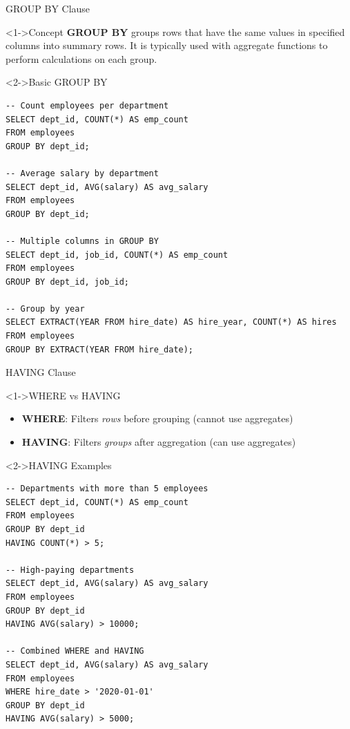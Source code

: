 \documentclass[aspectratio=169,11pt]{beamer}
\begin{document}
\begin{frame}[fragile]{GROUP BY Clause}
\begin{block}<1->{Concept}
\textbf{GROUP BY} groups rows that have the same values in specified columns into summary rows. It is typically used with aggregate functions to perform calculations on each group.
\end{block}

\pause
\begin{exampleblock}<2->{Basic GROUP BY}
\begin{lstlisting}
-- Count employees per department
SELECT dept_id, COUNT(*) AS emp_count
FROM employees
GROUP BY dept_id;

-- Average salary by department
SELECT dept_id, AVG(salary) AS avg_salary
FROM employees
GROUP BY dept_id;

-- Multiple columns in GROUP BY
SELECT dept_id, job_id, COUNT(*) AS emp_count
FROM employees
GROUP BY dept_id, job_id;

-- Group by year
SELECT EXTRACT(YEAR FROM hire_date) AS hire_year, COUNT(*) AS hires
FROM employees
GROUP BY EXTRACT(YEAR FROM hire_date);
\end{lstlisting}
\end{exampleblock}
\end{frame}

\begin{frame}[fragile]{HAVING Clause}
\begin{block}<1->{WHERE vs HAVING}
\begin{itemize}
    \item \textbf{WHERE}: Filters \textit{rows} before grouping (cannot use aggregates)
    \item \textbf{HAVING}: Filters \textit{groups} after aggregation (can use aggregates)
\end{itemize}
\end{block}

\pause
\begin{exampleblock}<2->{HAVING Examples}
\begin{lstlisting}
-- Departments with more than 5 employees
SELECT dept_id, COUNT(*) AS emp_count
FROM employees
GROUP BY dept_id
HAVING COUNT(*) > 5;

-- High-paying departments
SELECT dept_id, AVG(salary) AS avg_salary
FROM employees
GROUP BY dept_id
HAVING AVG(salary) > 10000;

-- Combined WHERE and HAVING
SELECT dept_id, AVG(salary) AS avg_salary
FROM employees
WHERE hire_date > '2020-01-01'
GROUP BY dept_id
HAVING AVG(salary) > 5000;
\end{lstlisting}
\end{exampleblock}
\end{frame}
\end{document}

